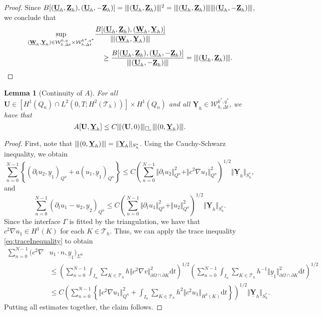 \documentclass[sn-mathphys-num]{sn-jnl}
\newtheorem{lem}[thm]{Lemma}
\numberwithin{equation}{section}
\newcommand{\wop}{\square_c}
\newcommand{\tnorm}[1]{\vert\hspace{-0.3mm}\Vert#1\Vert\hspace{-0.3mm}\vert}
\newcommand{\dT}{\mathrm{d}t}
\newcommand{\ProdFullyDiscrSpace}[2]{ \mathcal{W}^{ {#1},{#2}}_{h, \Delta t  } }
\newcommand{\Uh}{\underline{\mathbf{U}}_h}
\newcommand{\Yh}{\underline{\mathbf{Y}}_h}
\newcommand{\Zh}{\underline{\mathbf{Z}}_h}
\newcommand{\Wh}{\underline{\mathbf{W}}_h}
\newcommand{\dt}{\partial_t}
\begin{document}
\begin{proof}
    Since $B[(\Uh,\Zh),(\Uh,-\Zh)] = \tnorm{(\Uh,\Zh)}^2 = \tnorm{(\Uh,\Zh)}\tnorm{(\Uh,-\Zh)}$, we conclude that  
    \begin{align*}
        \sup_{(\Wh,\Yh) \in \ProdFullyDiscrSpace{k}{q} \times \ProdFullyDiscrSpace{k^\ast}{q^\ast}} &\frac{B[(\Uh,\Zh),(\Wh,\Yh)]}{\tnorm{(\Wh,\Yh)}} \\
        &\quad \ge \frac{B[(\Uh,\Zh),(\Uh,-\Zh)]}{\tnorm{(\Uh,-\Zh)}} = \tnorm{(\Uh,\Zh)}.
    \end{align*}
\end{proof}

 
\begin{lem}[Continuity of $A$]\label{lem:continuityA}
    For all $\mathbf{U} \in [H^1(Q_n) \cap L^2(0,T;H^2(\mathcal{T}_h))] \times H^1(Q_n)$ and all $\Yh \in \ProdFullyDiscrSpace{k^\ast}{q^\ast}$, we have that 
    \begin{equation*}
        A[\mathbf{U},\Yh] \le C \tnorm{(\mathbf{U}, 0)}_{\wop} \tnorm{(0,\Yh)}. 
    \end{equation*} 
\end{lem}

\begin{proof}
    First, note that $\tnorm{(0,\Yh)} = \Vert \Yh \Vert_{S_h^\ast}$. Using the Cauchy-Schwarz inequality, we obtain
    \begin{equation*}
        \sum_{n = 0}^{N-1} \left\{ (\dt u_2, \underline{y}_1)_{Q^n} + a(u_1,\underline{y}_1)_{Q^n} \right\} \le C \left( \sum_{n = 0}^{N-1} \Vert \dt u_2 \Vert^2_{Q^n} + \Vert c^2 \nabla u_1 \Vert^2_{Q^n} \right)^{1/2} \! \! \! \Vert \Yh \Vert_{S_h^{\ast}},
    \end{equation*}
    and 
    \begin{equation*}
        \sum_{n = 0}^{N-1} (\dt u_1 - u_2,\underline{y}_2)_{Q^n} \le C \left( \sum_{n = 0}^{N-1} \Vert \dt u_1 \Vert^2_{Q^n} + \Vert u_2 \Vert^2_{Q^n} \right)^{1/2} \Vert \Yh \Vert_{S_h^{\ast}}.
    \end{equation*}
    Since the interface $\Gamma$ is fitted by the triangulation, we have that $c^2 \nabla u_1 \in H^1(K)$ for each $K \in \mathcal{T}_h$. Thus, we can apply the trace inequality \eqref{eq:traceInequality} to obtain
    \begin{align*}
        \sum_{n = 0}^{N-1} (c^2 \nabla &u_1 \cdot n, \underline{y}_1)_{\Sigma^n} \\
        &\le \left( \sum_{n = 0}^{N-1} \int_{I_n} \sum_{K \in \mathcal{T}_h} h \Vert c^2 \nabla v \Vert_{\partial \Omega \cap \partial K}^2 \dT \right)^{1/2} \left( \sum_{n = 0}^{N-1} \int_{I_n} \sum_{K \in \mathcal{T}_h} h^{-1} \Vert \underline{y}_1 \Vert_{\partial \Omega \cap \partial K}^2 \dT \right)^{1/2} \\
        &\le C \left( \sum_{n = 0}^{N-1} \left\{ \Vert c^2 \nabla u_1 \Vert^2_{Q^n} + \int_{I_n} \sum_{K \in \mathcal{T}_h} h^2 \Vert c^2 u_1 \Vert_{H^2(K)} \dT \right\} \right)^{1/2} \Vert \Yh \Vert_{S_h^{\ast}}.
    \end{align*}
    Putting all estimates together, the claim follows. 
\end{proof}
\end{document}
